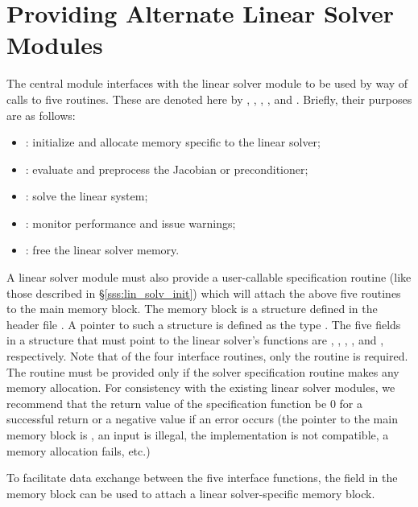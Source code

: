 \chapter{Providing Alternate Linear Solver Modules}\label{s:new_linsolv}
The central {\idas} module interfaces with the linear solver module to be
used by way of calls to five routines.  These are denoted here by 
, , , , and .
Briefly, their purposes are as follows:
\begin{itemize}
\item {}: initialize and allocate memory specific to the
  linear solver;
\item {}: evaluate and preprocess the Jacobian or preconditioner;
\item {}: solve the linear system;
\item {}: monitor performance and issue warnings;
\item {}: free the linear solver memory.
\end{itemize}
A linear solver module must also provide a user-callable specification routine
(like those described in \S\ref{sss:lin_solv_init}) which will attach
the above five routines to the main {\idas} memory block. 
The {\idas} memory block is a structure defined in the header file . 
A pointer to such a structure is defined as the type . 
The five fields in a  structure that must point to the linear solver's 
functions are , , , , 
and , respectively.
Note that of the four interface routines, only the  routine is required. 
The  routine must be provided only if the solver specification routine
makes any memory allocation.
For consistency with the existing {\idas} linear solver modules, we
recommend that the return value of the specification function be 0 for
a successful return or a negative value if an error occurs (the
pointer to the main {\idas} memory block is , an input is
illegal, the {\nvector} implementation is not compatible, a memory
allocation fails, etc.)

To facilitate data exchange between the five interface functions, the
field  in the {\idas} memory block can be used to attach
a linear solver-specific memory block.

